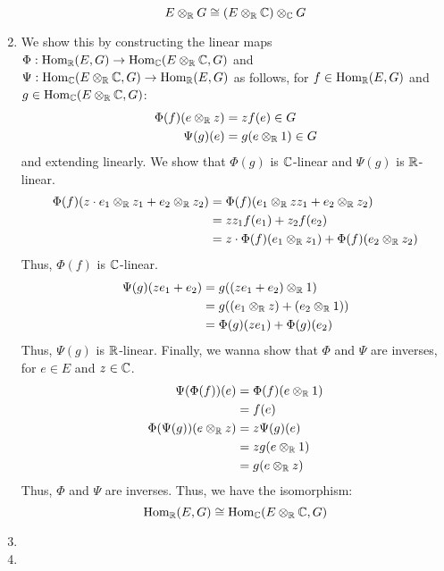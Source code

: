 \documentclass[12pt]{article}
\begin{document}
\begin{solu}
\begin{enumerate}
        \[E \otimes_\mathbb R G \cong (E \otimes_\mathbb R \mathbb C) \otimes_\mathbb C G\]
        \item We show this by constructing the linear maps $\Phi: \operatorname{Hom}_\mathbb R(E, G) \to \operatorname{Hom}_\mathbb C(E \otimes_\mathbb R \mathbb C, G)$ and $\Psi: \operatorname{Hom}_\mathbb C(E \otimes_\mathbb R \mathbb C, G) \to \operatorname{Hom}_\mathbb R(E, G)$ as follows, for $f \in \operatorname{Hom}_\mathbb R(E, G)$ and $g \in \operatorname{Hom}_\mathbb C(E \otimes_\mathbb R \mathbb C, G)$:
        \begin{align*}
            \Phi(f)(e \otimes_\mathbb R z) &= zf(e) \in G \\
            \Psi(g)(e) &= g(e \otimes_\mathbb R 1) \in G
        \end{align*}
        and extending linearly. We show that $\Phi(g)$ is $\mathbb C$-linear and $\Psi(g)$ is $\mathbb R$-linear. 
        \begin{align*}
            \Phi(f)(z \cdot e_1 \otimes_\mathbb R z_1 + e_2 \otimes_\mathbb R z_2) &= \Phi(f)(e_1 \otimes_\mathbb R zz_1 + e_2 \otimes_\mathbb R z_2) \\
            &= zz_1f(e_1) + z_2f(e_2) \\
            &= z\cdot \Phi(f)(e_1 \otimes_\mathbb R z_1)  + \Phi(f)(e_2 \otimes_\mathbb R z_2)
        \end{align*}
        Thus, $\Phi(f)$ is $\mathbb C$-linear.
        \begin{align*}
            \Psi(g)(ze_1 + e_2) &= g((ze_1+e_2) \otimes_\mathbb R 1) \\
            &= g((e_1 \otimes_\mathbb R z) + (e_2 \otimes_\mathbb R 1)) \\
            &= \Phi(g)(ze_1) + \Phi(g)(e_2)
        \end{align*}
        Thus, $\Psi(g)$ is $\mathbb R$-linear. Finally, we wanna show that $\Phi$ and $\Psi$ are inverses, for $e\in E$ and $z \in \mathbb C$. 
        \begin{align*}
            \Psi(\Phi(f))(e) &= \Phi(f)(e \otimes_\mathbb R 1) \\
            &= f(e) \\
            \Phi(\Psi(g))(e \otimes_\mathbb R z) &= z\Psi(g)(e) \\
            &= zg(e \otimes_\mathbb R 1) \\
            &= g(e \otimes_\mathbb R z)
        \end{align*}
        Thus, $\Phi$ and $\Psi$ are inverses. Thus, we have the isomorphism:
        \[\operatorname{Hom}_\mathbb R(E, G) \cong \operatorname{Hom}_\mathbb C(E \otimes_\mathbb R \mathbb C, G)\]
        \item 
        \item  
    \end{enumerate}
\end{solu}
\end{document}

